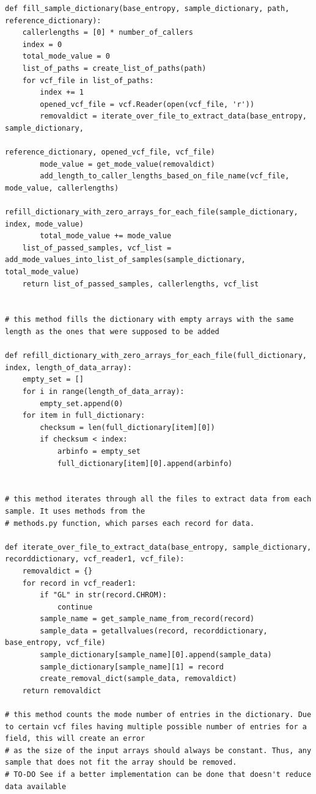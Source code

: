 \documentclass{article}
\begin{document}
\begin{verbatim}
def fill_sample_dictionary(base_entropy, sample_dictionary, path, reference_dictionary):
    callerlengths = [0] * number_of_callers
    index = 0
    total_mode_value = 0
    list_of_paths = create_list_of_paths(path)
    for vcf_file in list_of_paths:
        index += 1
        opened_vcf_file = vcf.Reader(open(vcf_file, 'r'))
        removaldict = iterate_over_file_to_extract_data(base_entropy, sample_dictionary,
                                                        reference_dictionary, opened_vcf_file, vcf_file)
        mode_value = get_mode_value(removaldict)
        add_length_to_caller_lengths_based_on_file_name(vcf_file, mode_value, callerlengths)
        refill_dictionary_with_zero_arrays_for_each_file(sample_dictionary, index, mode_value)
        total_mode_value += mode_value
    list_of_passed_samples, vcf_list = add_mode_values_into_list_of_samples(sample_dictionary, total_mode_value)
    return list_of_passed_samples, callerlengths, vcf_list


# this method fills the dictionary with empty arrays with the same length as the ones that were supposed to be added

def refill_dictionary_with_zero_arrays_for_each_file(full_dictionary, index, length_of_data_array):
    empty_set = []
    for i in range(length_of_data_array):
        empty_set.append(0)
    for item in full_dictionary:
        checksum = len(full_dictionary[item][0])
        if checksum < index:
            arbinfo = empty_set
            full_dictionary[item][0].append(arbinfo)


# this method iterates through all the files to extract data from each sample. It uses methods from the
# methods.py function, which parses each record for data.

def iterate_over_file_to_extract_data(base_entropy, sample_dictionary, recorddictionary, vcf_reader1, vcf_file):
    removaldict = {}
    for record in vcf_reader1:
        if "GL" in str(record.CHROM):
            continue
        sample_name = get_sample_name_from_record(record)
        sample_data = getallvalues(record, recorddictionary, base_entropy, vcf_file)
        sample_dictionary[sample_name][0].append(sample_data)
        sample_dictionary[sample_name][1] = record
        create_removal_dict(sample_data, removaldict)
    return removaldict

# this method counts the mode number of entries in the dictionary. Due to certain vcf files having multiple possible number of entries for a field, this will create an error
# as the size of the input arrays should always be constant. Thus, any sample that does not fit the array should be removed. 
# TO-DO See if a better implementation can be done that doesn't reduce data available
	

\end{verbatim}
\end{document}
